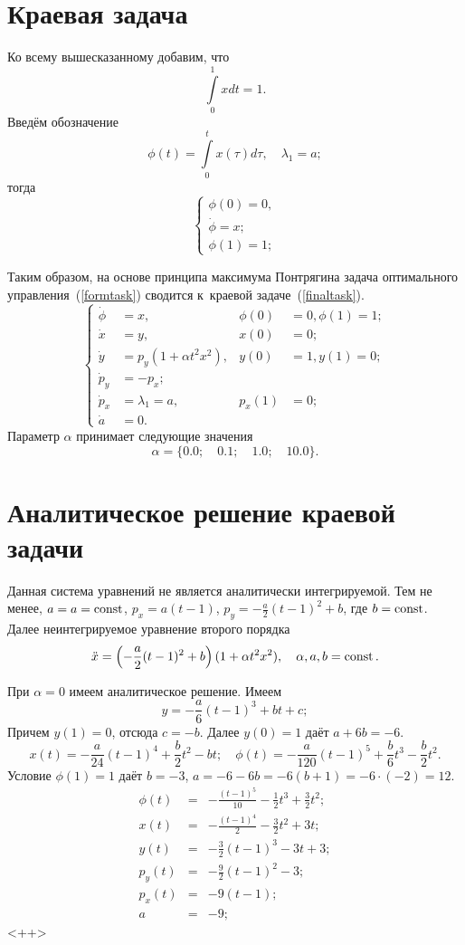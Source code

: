 \section{Краевая задача}
Ко всему вышесказанному добавим, что 
\[
\int\limits_{0}^{1} x dt = 1.
\]
Введём обозначение
\[
\phi(t) = \int\limits_{0}^{t} x(\tau) d\tau, \quad \lambda_1 = a;
\]
тогда 
\begin{equation}\label{dopeqq}
\begin{cases}
\phi(0) = 0,\\ 
\dot\phi = x;\\
\phi(1) = 1;
\end{cases}
\end{equation}

Таким образом, на основе принципа максимума Понтрягина задача оптимального управления~(\ref{formtask}) сводится к~краевой задаче~(\ref{finaltask}). 
\begin{equation}\label{finaltask}\left\{
\begin{aligned}
	\dot\phi &= x,&\phi(0)&=0,\phi(1)=1;\\
	\dot{x} &= y,&x(0)&=0; \\
	\dot{y} &= p_y (1 + \alpha t^2x^2),&y(0)&=1,y(1)=0;\\ %
	\dot{p}_y &= - p_x;\\
	\dot{p}_x &= \lambda_1 = a,&p_x(1)&=0; \\
	\dot{a} &= 0.
\end{aligned}\right.
\end{equation}
Параметр $\alpha$ принимает следующие значения
\[ \alpha = \{0.0;\quad 0.1; \quad 1.0; \quad 10.0\}.\]

\section{Аналитическое решение краевой задачи}
Данная система уравнений не является аналитически интегрируемой. Тем не менее, $a = a=\operatorname{const}$, $p_x = a(t-1)$, $p_y = -\frac a2(t-1)^2 + b$, где $b=\operatorname{const}$. Далее неинтегрируемое уравнение второго порядка
\[
  \ddot x = \left( -\frac a2(t-1)^2 + b \right)(1+\alpha t^2 x^2),\quad
  \alpha,a,b= \operatorname{const}.
\]

При $\alpha=0$ имеем аналитическое решение. Имеем
\[
  y = -\frac a6(t-1)^3 + bt + c;
\]
Причем $y(1)=0$, отсюда $c = -b$. Далее $y(0)=1$ даёт $a + 6b = -6$.
\[
  x(t) = -\frac a{24}(t-1)^4 + \frac b2 t^2 - bt;\quad
  \phi(t) = -\frac a{120}(t-1)^5 + \frac b6 t^3 - \frac b2 t^2.
\]
Условие $\phi(1)=1$ даёт $b= -3$, $a= -6 - 6b = -6(b+1) = -6 \cdot (-2) = 12$.
\begin{eqnarray*}
  \phi(t) &=&  -\frac{(t-1)^5}{10}  - \frac12 t^3 + \frac32 t^2;\\
  x(t)    &=& -\frac{(t-1)^4}2 - \frac32 t^2 + 3 t;\\
  y(t) &=& -\frac32(t-1)^3 - 3 t + 3;\\
  p_y(t) &=& -\frac92(t-1)^2 - 3;\\
  p_x(t) &=& -9(t-1);\\
  a &=&  -9;
\end{eqnarray*}<++>
